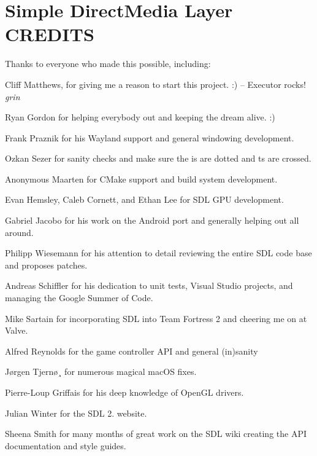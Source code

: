 \chapter{Simple Direct\+Media Layer CREDITS }
\hypertarget{md__mono_runtime_2extern_2sdl_2_c_r_e_d_i_t_s}{}\label{md__mono_runtime_2extern_2sdl_2_c_r_e_d_i_t_s}
\label{md__mono_runtime_2extern_2sdl_2_c_r_e_d_i_t_s_autotoc_md1162}%
%


Thanks to everyone who made this possible, including:\+


\begin{DoxyItemize}
\item Cliff Matthews, for giving me a reason to start this project. :\+) -- Executor rocks! {\itshape grin}
\item Ryan Gordon for helping everybody out and keeping the dream alive. :\+)
\item Frank Praznik for his Wayland support and general windowing development.
\item Ozkan Sezer for sanity checks and make sure the i\textquotesingle{}s are dotted and t\textquotesingle{}s are crossed.
\item Anonymous Maarten for CMake support and build system development.
\item Evan Hemsley, Caleb Cornett, and Ethan Lee for SDL GPU development.
\item Gabriel Jacobo for his work on the Android port and generally helping out all around.
\item Philipp Wiesemann for his attention to detail reviewing the entire SDL code base and proposes patches.
\item Andreas Schiffler for his dedication to unit tests, Visual Studio projects, and managing the Google Summer of Code.
\item Mike Sartain for incorporating SDL into Team Fortress 2 and cheering me on at Valve.
\item Alfred Reynolds for the game controller API and general (in)sanity
\item Jørgen Tjernø¸ for numerous magical mac\+OS fixes.
\item Pierre-\/\+Loup Griffais for his deep knowledge of Open\+GL drivers.
\item Julian Winter for the SDL 2. website.
\item Sheena Smith for many months of great work on the SDL wiki creating the API documentation and style guides.

\end{DoxyItemize}
